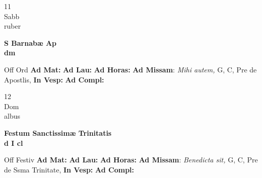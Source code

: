 \documentclass[10pt, openany]{book}
\begin{document}
        \begin{center}
            \begin{minipage}{3.5in}
                \vspace{2em}
                \begin{minipage}{0.5in}
                    {\Huge 11} \\
                    {\normalsize Sabb} \\
                    {\normalsize ruber}
                \end{minipage}
                \begin{minipage}{3.0in}
                    \textbf{ \large S Barnabæ Ap \\
                    \textnormal{\normalsize dm}} \\ 
                \end{minipage}
                \begin{justify}Off Ord
                    \textbf{Ad Mat: }
                    \textbf{Ad Lau: }
                    \textbf{Ad Horas: }\textbf{Ad Missam}: \textit{Mihi autem,} G, C, Pre de Apostlis,  
                    \textbf{In Vesp: }
                    \textbf{Ad Compl: }
                \end{justify}
            \end{minipage}
        \end{center}
    
        \begin{center}
            \begin{minipage}{3.5in}
                \vspace{2em}
                \begin{minipage}{0.5in}
                    {\Huge 12} \\
                    {\normalsize Dom} \\
                    {\normalsize albus}
                \end{minipage}
                \begin{minipage}{3.0in}
                    \textbf{ \large Festum Sanctissimæ Trinitatis \\
                    \textnormal{\normalsize d I cl}} \\ 
                \end{minipage}
                \begin{justify}Off Festiv
                    \textbf{Ad Mat: }
                    \textbf{Ad Lau: }
                    \textbf{Ad Horas: }\textbf{Ad Missam}: \textit{Benedicta sit,} G, C, Pre de Ssma Trinitate,  
                    \textbf{In Vesp: }
                    \textbf{Ad Compl: }
                \end{justify}
            \end{minipage}
        \end{center}
    
\end{document}
